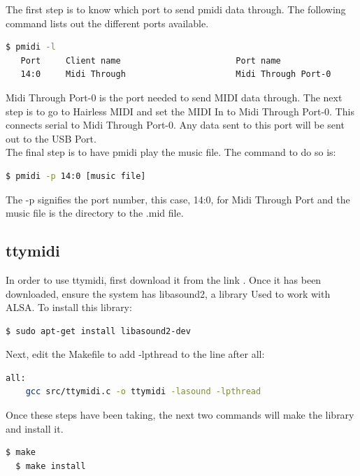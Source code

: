 \documentclass[11pt, a4paper]{report}
\begin{document}
The first step is to know which port to send pmidi data through. The following command lists out the different ports available.

\begin{lstlisting}[language=bash]
  $ pmidi -l
   Port     Client name                       Port name
   14:0     Midi Through                      Midi Through Port-0
\end{lstlisting}

Midi Through Port-0 is the port needed to send MIDI data through. The next step is to go to Hairless MIDI and set the MIDI In to Midi Through Port-0. This connects serial to Midi Through Port-0. Any data sent to this port will be sent out to the USB Port. \\

The final step is to have pmidi play the music file. The command to do so is:


\begin{lstlisting}[language=bash]
  $ pmidi -p 14:0 [music file]
\end{lstlisting}

The -p signifies the port number, this case, 14:0, for Midi Through Port and the music file is the directory to the .mid file. \\


\subsection{ttymidi}

In order to use ttymidi, first download it from the link \cite{ttymidi}. Once it has been downloaded, ensure the system has libasound2, a library Used to work with ALSA. To install this library:


\begin{lstlisting}[language=bash]
  $ sudo apt-get install libasound2-dev
\end{lstlisting}

Next, edit the Makefile to add -lpthread to the line after all:

\begin{lstlisting}[language=bash]
all:
    gcc src/ttymidi.c -o ttymidi -lasound -lpthread
\end{lstlisting}

Once these steps have been taking, the next two commands will make the library and install it. 

\begin{lstlisting}[language=bash]
  $ make
  $ make install
\end{lstlisting}
\end{document}
